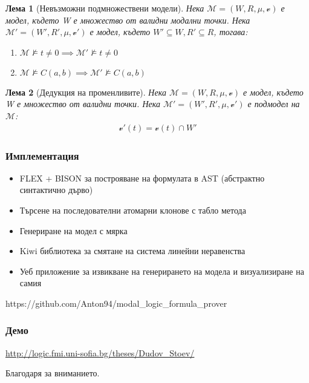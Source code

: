 \documentclass{beamer}
\newtheorem{lema}{Лема}[section]
\newcommand{\vE}{\mathscr{v}}
\begin{document}
\begin{frame}
\begin{lema}[Невъзможни подмножествени модели]
Нека $\mathcal{M} = (W, R, \mu,\vE)$ е модел, където W е множество от валидни модални точки.
Нека $\mathcal{M'} = (W', R', \mu, \vE')$ е модел, където $W' \subseteq W, R' \subseteq R$, тогава:
	\begin{enumerate}
		\item $\mathcal{M} \not\models t \neq 0 \implies \mathcal{M'} \not\models t \neq 0$
		\item $\mathcal{M} \not\models C(a,b) \implies \mathcal{M'} \not\models C(a,b)$
	\end{enumerate}
	\end{lema}
	
	\begin{lema}[Дедукция на променливите]
		Нека $\mathcal{M} = (W, R, \mu, \vE)$ е модел, където W е множество от валидни точки.
		Нека $\mathcal{M'} = (W', R', \mu, \vE')$ е подмодел на $\mathcal{M}$:
		\begin{align*}
			\vE'(t) =  \vE(t) \cap W'
		\end{align*}
	\end{lema}
\end{frame}

\begin{frame}\frametitle{Имплементация}
\begin{itemize}
	\item FLEX + BISON за построяване на формулата в AST (абстрактно синтактично дърво)
	\item Търсене на последователни атомарни клонове с табло метода
	\item Генериране на модел с мярка
	\item Kiwi библиотека за смятане на система линейни неравенства
	\item Уеб приложение за извикване на генерирането на модела и визуализиране на самия
\end{itemize}
 https://github.com/Anton94/modal\_logic\_formula\_prover
\end{frame}

\begin{frame}\frametitle{Демо}
\url{http://logic.fmi.uni-sofia.bg/theses/Dudov\_Stoev/}
\end{frame}

\begin{frame}
Благодаря за вниманието.
\end{frame}
\end{document}
